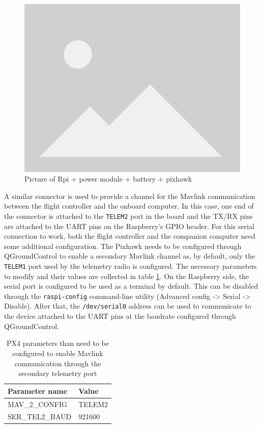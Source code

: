 
\begin{figure}
  \centering
  \includegraphics[width=.6\textwidth, keepaspectratio]{img/placeholder.png}
  \caption{Picture of Rpi + power module + battery + pixhawk}\label{fig:power-supply}
\end{figure}



A similar connector is used to provide a channel for the Mavlink communication between the flight controller and the onboard computer.
In this case, one end of the connector is attached to the \verb|TELEM2| port in the board and the TX/RX pins are attached to the UART pins on the Raspberry's GPIO header.
For this serial connection to work, both the flight controller and the companion computer need some additional configuration.
The Pixhawk needs to be configured through QGroundControl to enable a secondary Mavlink channel as, by default, only the \verb|TELEM1| port used by the telemetry radio is configured.
The necessary parameters to modify and their values are collected in table \ref{tab:telem2-params}.
On the Raspberry side, the serial port is configured to be used as a terminal by default.
This can be disabled through the \verb|raspi-config| command-line utility (Advanced config -> Serial -> Disable).
After that, the \verb|/dev/serial0| address can be used to communicate to the device attached to the UART pins at the baudrate configured through QGroundControl.

\begin{table}[h!]
 \begin{center}
  \begin{tabular}{l|l}
    Parameter name & Value \\ \hline
    MAV\_2\_CONFIG & TELEM2 \\
    SER\_TEL2\_BAUD & 921600 \\
  \end{tabular}
  \caption{PX4 parameters than need to be configured to enable Mavlink communication through the secondary telemetry port}
  \label{tab:telem2-params}
 \end{center}
\end{table}


